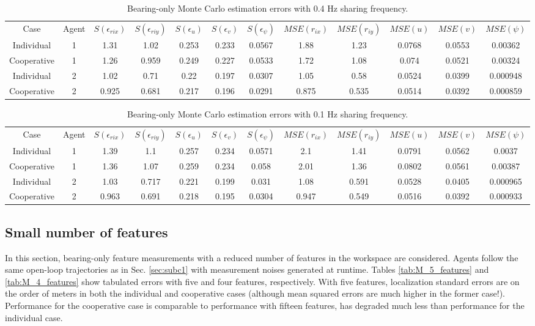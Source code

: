 \documentclass{aiaa-tc}
\begin{document}
\begin{table}[b!]
\scriptsize
\centering
\begin{tabular}{c|c|c|c|c|c|c|c|c|c|c|c|}
Case & Agent & $S(\epsilon_{rix})$ & $S(\epsilon_{riy})$ & $S(\epsilon_{u})$ & $S(\epsilon_{v})$ & $S(\epsilon_{\psi})$ & $MSE(r_{ix})$ & $MSE(r_{iy})$ & $MSE(u)$ & $MSE(v)$ & $MSE(\psi)$ \\
Individual & 1& 1.31& 1.02& 0.253& 0.233& 0.0567& 1.88& 1.23& 0.0768& 0.0553& 0.00362 \\
Cooperative & 1& 1.26& 0.959& 0.249& 0.227& 0.0533& 1.72& 1.08& 0.074& 0.0521& 0.00324 \\
Individual & 2& 1.02& 0.71& 0.22& 0.197& 0.0307& 1.05& 0.58& 0.0524& 0.0399& 0.000948 \\
Cooperative & 2& 0.925& 0.681& 0.217& 0.196& 0.0291& 0.875& 0.535& 0.0514& 0.0392& 0.000859
\end{tabular}
\caption{Bearing-only Monte Carlo estimation errors with 0.4 Hz sharing frequency.}
\label{tab:K_25}
\end{table}

\begin{table}[b!]
\scriptsize
\centering
\begin{tabular}{c|c|c|c|c|c|c|c|c|c|c|c|}
Case & Agent & $S(\epsilon_{rix})$ & $S(\epsilon_{riy})$ & $S(\epsilon_{u})$ & $S(\epsilon_{v})$ & $S(\epsilon_{\psi})$ & $MSE(r_{ix})$ & $MSE(r_{iy})$ & $MSE(u)$ & $MSE(v)$ & $MSE(\psi)$ \\
Individual & 1& 1.39& 1.1& 0.257& 0.234& 0.0571& 2.1& 1.41& 0.0791& 0.0562& 0.0037 \\
Cooperative & 1& 1.36& 1.07& 0.259& 0.234& 0.058& 2.01& 1.36& 0.0802& 0.0561& 0.00387 \\
Individual & 2& 1.03& 0.717& 0.221& 0.199& 0.031& 1.08& 0.591& 0.0528& 0.0405& 0.000965 \\
Cooperative & 2& 0.963& 0.691& 0.218& 0.195& 0.0304& 0.947& 0.549& 0.0516& 0.0392& 0.000933
\end{tabular}
\caption{Bearing-only Monte Carlo estimation errors with 0.1 Hz sharing frequency.}
\label{tab:K_100}
\end{table}

\pagebreak
\subsection{Small number of features}

In this section, bearing-only feature measurements with a reduced number of features in the workspace are considered. Agents follow the same open-loop trajectories as in Sec. \ref{sec:subc1} with measurement noises generated at runtime. Tables \ref{tab:M_5_features} and \ref{tab:M_4_features} show tabulated errors with five and four features, respectively. With five features, localization standard errors are on the order of meters in both the individual and cooperative cases (although mean squared errors are much higher in the former case!). Performance for the cooperative case is comparable to performance with fifteen features, has degraded much less than performance for the individual case.
\end{document}
